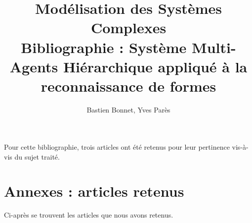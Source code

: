 \documentclass[a4paper,11pt]{article}
\begin{document}
\hypersetup{urlcolor=dark-gray}


\newcommand\msc{MSC}
\newcommand\mscLong{Modélisation des Systèmes Complexes}
\newcommand\sma{SMA}
\newcommand\smaLong[1]{Système#1 Multi-Agents}
\newcommand\smah[1]{\sma{} Hiérarchique#1}
\newcommand\smahLong[1]{\smaLong{#1} Hiérarchique#1}


\title{\mscLong{}\\Bibliographie : \smahLong{} appliqué à la reconnaissance de formes}
\author{Bastien Bonnet, Yves Parès}
\maketitle{}

Pour cette bibliographie, trois articles ont été retenus pour leur pertinence vis-à-vis du sujet traité.

\nocite{*}






\newpage






 \section{Annexes : articles retenus}
 Ci-après se trouvent les articles que nous avons retenus.
\end{document}
